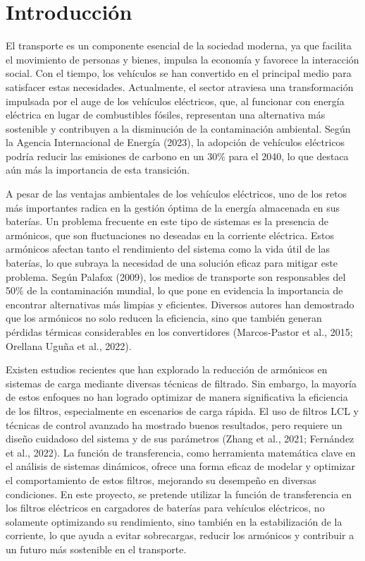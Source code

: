 \section{Introducci\'on}
\label{sec:introduccion}

El transporte es un componente esencial de la sociedad moderna, ya que facilita el movimiento de personas y bienes, impulsa la econom\'ia y favorece la interacci\'on social. Con el tiempo, los veh\'iculos se han convertido en el principal medio para satisfacer estas necesidades. Actualmente, el sector atraviesa una transformaci\'on impulsada por el auge de los veh\'iculos el\'ectricos, que, al funcionar con energ\'ia el\'ectrica en lugar de combustibles f\'osiles, representan una alternativa m\'as sostenible y contribuyen a la disminuci\'on de la contaminaci\'on ambiental. Seg\'un la Agencia Internacional de Energ\'ia (2023), la adopci\'on de veh\'iculos el\'ectricos podr\'ia reducir las emisiones de carbono en un 30\% para el 2040, lo que destaca a\'un m\'as la importancia de esta transici\'on.
\setlength{\parskip}{1em}

A pesar de las ventajas ambientales de los veh\'iculos el\'ectricos, uno de los retos m\'as importantes radica en la gesti\'on \'optima de la energ\'ia almacenada en sus bater\'ias. Un problema frecuente en este tipo de sistemas es la presencia de arm\'onicos, que son fluctuaciones no deseadas en la corriente el\'ectrica. Estos arm\'onicos afectan tanto el rendimiento del sistema como la vida \'util de las bater\'ias, lo que subraya la necesidad de una soluci\'on eficaz para mitigar este problema. Seg\'un Palafox (2009), los medios de transporte son responsables del 50\% de la contaminaci\'on mundial, lo que pone en evidencia la importancia de encontrar alternativas m\'as limpias y eficientes. Diversos autores han demostrado que los arm\'onicos no solo reducen la eficiencia, sino que tambi\'en generan p\'erdidas t\'ermicas considerables en los convertidores (Marcos-Pastor et al., 2015; Orellana Ugu\~na et al., 2022).
\setlength{\parskip}{1em}

Existen estudios recientes que han explorado la reducci\'on de arm\'onicos en sistemas de carga mediante diversas t\'ecnicas de filtrado. Sin embargo, la mayor\'ia de estos enfoques no han logrado optimizar de manera significativa la eficiencia de los filtros, especialmente en escenarios de carga r\'apida. El uso de filtros LCL y t\'ecnicas de control avanzado ha mostrado buenos resultados, pero requiere un dise\~no cuidadoso del sistema y de sus par\'ametros (Zhang et al., 2021; Fern\'andez et al., 2022). La funci\'on de transferencia, como herramienta matem\'atica clave en el an\'alisis de sistemas din\'amicos, ofrece una forma eficaz de modelar y optimizar el comportamiento de estos filtros, mejorando su desempe\~no en diversas condiciones. En este proyecto, se pretende utilizar la funci\'on de transferencia en los filtros el\'ectricos en cargadores de bater\'ias para veh\'iculos el\'ectricos, no solamente optimizando su rendimiento, sino tambi\'en en la estabilizaci\'on de la corriente, lo que ayuda a evitar sobrecargas, reducir los arm\'onicos y contribuir a un futuro m\'as sostenible en el transporte.
\setlength{\parskip}{1em}

